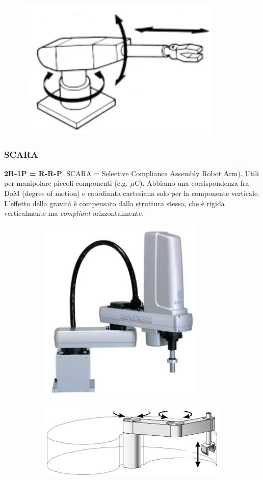 \begin{figure}[H]
	\centering
	\includegraphics[width=0.25\linewidth]{images/kinematic_chains_10}
	\label{fig:kinematicchains10}
\end{figure}
	

\subsubsection{SCARA}
\textbf{2R-1P = R-R-P}. SCARA = Selective Compliance Assembly Robot Arm). Utili per manipolare piccoli componenti (e.g. $\mu$C). Abbiamo una corrispondenza fra DoM (degree of motion) e coordinata cartesiana solo per la componente verticale. L'effetto della gravità è compensato dalla struttura stessa, che è rigida verticalmente ma \textit{compliant} orizzontalmente.

\begin{figure}[H]
	\begin{subfigure}{0.5\linewidth}
		\centering
		\includegraphics[width=0.4\linewidth]{images/kinematic_chains_8}
		\label{fig:kinematicchains8}
	\end{subfigure}
	\begin{subfigure}{0.5\linewidth}
		\centering
		\includegraphics[width=0.7\linewidth]{images/kinematic_chains_15}
		\label{fig:kinematicchains15}
	\end{subfigure}
\end{figure}


